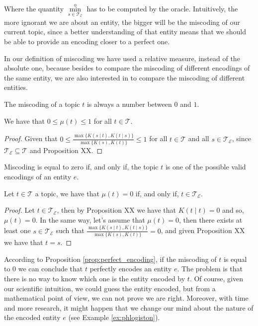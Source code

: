 Where the quantity $\overset{o}{ \underset{s \in \mathcal{T}_\mathcal{E}} \min}$ has to be computed by the oracle. Intuitively, the more ignorant we are about an entity, the bigger will be the miscoding of our current topic, since a better understanding of that entity means that we should be able to provide an encoding closer to a perfect one.

In our definition of miscoding we have used a relative measure, instead of the absolute one, because besides to compare the miscoding of different encodings of the same entity, we are also interested in to compare the miscoding of different entities.

The miscoding of a topic $t$ is always a number between $0$ and $1$.

\begin{proposition}
\label{prop:range_miscoding}
We have that $0 \leq \mu(t) \leq 1$ for all $t \in \mathcal{T}$.
\end{proposition}
\begin{proof}
Given that $0 \leq \frac{ \max\{ K(s \mid t), K(t \mid s) \} } { \max\{ K(s), K(t) \} } \leq 1$ for all $t \in \mathcal{T}$ and all $s \in \mathcal{T}_\mathcal{E}$, since $\mathcal{T}_\mathcal{E} \subseteq \mathcal{T}$ and Proposition {\color{red} XX}.
\end{proof}

Miscoding is equal to zero if, and only if, the topic $t$ is one of the possible valid encodings of an entity $e$.

\begin{proposition}\label{prop:perfect_encoding}
Let $t \in \mathcal{T}$ a topic, we have that $\mu(t) = 0$ if, and only if, $t \in \mathcal{T}_\mathcal{E}$.
\end{proposition}
\begin{proof}
Let $t \in \mathcal{T}_\mathcal{E}$, then by Proposition {\color{red} XX} we have that $K(t \mid t) = 0$ and so, $\mu(t) = 0$. In the same way, let's assume that $\mu(t) = 0$, then there exists at least one $s \in \mathcal{T}_\mathcal{E}$ such that $\frac{ \max\{ K(s \mid t), K(t \mid s) \} } { \max\{ K(s), K(t) \} } = 0$, and given Proposition {\color{red} XX} we have that $t = s$.
\end{proof}

According to Proposition \ref{prop:perfect_encoding}, if the miscoding of $t$ is equal to 0 we can conclude that $t$ perfectly encodes an entity $e$. The problem is that there is no way to know which one is the entity encoded by $t$. Of course, given our scientific intuition, we could guess the entity encoded, but from a mathematical point of view, we can not prove we are right. Moreover, with time and more research, it might happen that we change our mind about the nature of the encoded entity $e$ (see Example \ref{ex:phlogiston}).

